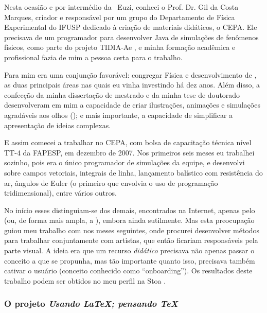 Nesta ocasião e por intermédio da \profa\ Euzi, conheci o Prof. Dr. Gil da Costa Marques, criador e responsável por um grupo do Departamento de Física Experimental do IFUSP dedicado à criação de materiais didáticos, o CEPA. Ele precisava de um programador para desenvolver  Java de simulações de fenômenos físicos, como parte do projeto TIDIA-Ae \cite{tidia}, e minha formação acadêmica e profissional fazia de mim a pessoa certa para o trabalho.

Para mim era uma conjunção favorável: congregar Física e desenvolvimento de , as duas principais áreas nas quais eu vinha investindo há dez anos. Além disso, a confecção da minha dissertação de mestrado e da minha tese de doutorado desenvolveram em mim a capacidade de criar ilustrações, animações e simulações agradáveis aos olhos (); e mais importante, a capacidade de simplificar a apresentação de ideias complexas.

E assim comecei a trabalhar no CEPA, com bolsa de capacitação técnica nível TT-4 da FAPESP, em dezembro de 2007. Nos primeiros seis meses eu trabalhei sozinho, pois era o único programador de simulações da equipe, e desenvolvi  sobre campos vetoriais, integrais de linha, lançamento balístico com resistência do ar, ângulos de Euler (o primeiro que envolvia o uso de programação tridimensional), entre vários outros.%

No início esses  distinguiam-se dos demais, encontrados na Internet, apenas pelo  (ou, de forma mais ampla, a ), embora ainda sutilmente. Mas esta preocupação guiou meu trabalho com  nos meses seguintes, onde procurei desenvolver métodos para trabalhar conjuntamente com artistas, que então ficariam responsáveis pela parte visual. A ideia era que um recurso \emph{didático} precisava não apenas passar o conceito a que se propunha, mas tão importante quanto isso, precisava também cativar o usuário (conceito conhecido como ``onboarding''). Os resultados deste trabalho podem ser obtidos no meu perfil na  Stoa \cite{irpagnossin-stoa}.

\subsubsection{O projeto \textsl{Usando \LaTeX; pensando \TeX}}
\label{sec:latex}

